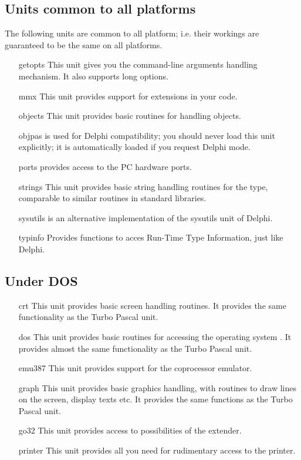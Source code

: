 \documentclass{book}
\begin{document}
%
%
\subsection{Units common to all platforms}
The following units are common to all platform; i.e. their workings
are guaranteed to be the same on all platforms.
\begin{itemize}
\item [getopts] This unit gives you the \gnu {} command-line
arguments  handling mechanism. It also supports long options.
\item [mmx] This unit provides support for  extensions in your
code.
\item [objects]  This unit provides basic routines for handling objects.
\item [objpas] is used for Delphi compatibility; you should never load this
unit explicitly; it is automatically loaded if you request Delphi mode.
\item [ports] provides access to the PC hardware ports.
\item [strings] This unit provides basic string handling routines for the
 type, comparable to similar routines in standard 
libraries.
\item[sysutils] is an alternative implementation of the sysutils unit of
Delphi.
\item[typinfo] Provides functions to acces Run-Time Type Information, just
like Delphi.
\end{itemize}

%
%
\subsection{Under DOS}
\begin{itemize}
\item [crt] This unit provides basic screen handling routines.
It provides the same functionality  as the Turbo Pascal  unit.
\item [dos] This unit provides basic routines for accessing the operating
system \dos. It provides almost the same functionality as the Turbo Pascal
unit.
\item [emu387] This unit provides support for the coprocessor emulator.
\item [graph] This unit provides basic graphics handling, with routines to
draw lines on the screen, display texts etc. It provides the same functions
as the Turbo Pascal unit.
\item [go32] This unit provides access to possibilities of the 
\dos extender.
\item [printer]  This unit provides all you need for rudimentary access
to the printer.
\end{itemize}
\end{document}
